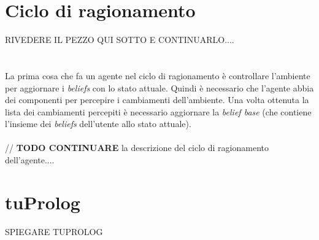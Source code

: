 \documentclass[12pt,a4paper,openright,twoside]{report}
\begin{document}
\section{Ciclo di ragionamento}
RIVEDERE IL PEZZO QUI SOTTO E CONTINUARLO....
\\
\\
\\
La prima cosa che fa un agente nel ciclo di ragionamento \`e controllare l'ambiente per aggiornare i \textit{beliefs} con lo stato attuale. Quindi \`e necessario che l'agente abbia dei componenti per percepire i cambiamenti dell'ambiente. Una volta ottenuta la lista dei cambiamenti percepiti \`e necessario aggiornare la \textit{belief base} (che contiene l'insieme dei \textit{beliefs} dell'utente allo stato attuale).
\\
\\
// \textbf{TODO CONTINUARE} la descrizione del ciclo di ragionamento dell'agente....
%
%
%


\section{tuProlog}
SPIEGARE TUPROLOG
\end{document}

